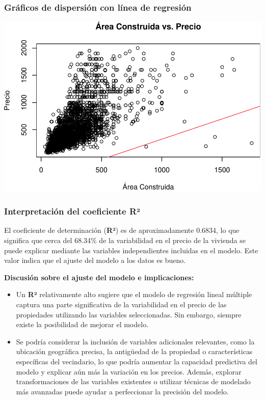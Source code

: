 \documentclass[
]{article}
\begin{document}
\subsubsection{\texorpdfstring{\textbf{Gráficos de dispersión con línea
de
regresión}}{Gráficos de dispersión con línea de regresión}}\label{gruxe1ficos-de-dispersiuxf3n-con-luxednea-de-regresiuxf3n}

\includegraphics{A2_U2_InformeEjecutivo_files/figure-latex/unnamed-chunk-20-1.pdf}

\subsubsection{\texorpdfstring{\textbf{Interpretación del coeficiente
R²}}{Interpretación del coeficiente R²}}\label{interpretaciuxf3n-del-coeficiente-ruxb2}

El coeficiente de determinación (\textbf{R²}) es de aproximadamente
0.6834, lo que significa que cerca del 68.34\% de la variabilidad en el
precio de la vivienda se puede explicar mediante las variables
independientes incluidas en el modelo. Este valor indica que el ajuste
del modelo a los datos es bueno.

\textbf{Discusión sobre el ajuste del modelo e implicaciones:}

\begin{itemize}
\item
  Un \textbf{R²} relativamente alto sugiere que el modelo de regresión
  lineal múltiple captura una parte significativa de la variabilidad en
  el precio de las propiedades utilizando las variables seleccionadas.
  Sin embargo, siempre existe la posibilidad de mejorar el modelo.
\item
  Se podría considerar la inclusión de variables adicionales relevantes,
  como la ubicación geográfica precisa, la antigüedad de la propiedad o
  características específicas del vecindario, lo que podría aumentar la
  capacidad predictiva del modelo y explicar aún más la variación en los
  precios. Además, explorar transformaciones de las variables existentes
  o utilizar técnicas de modelado más avanzadas puede ayudar a
  perfeccionar la precisión del modelo.
\end{itemize}
\end{document}
